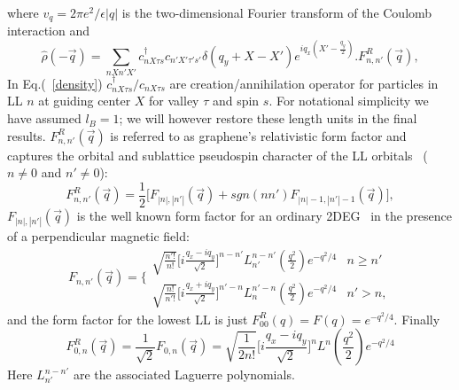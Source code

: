 \documentclass{ws-ijmpb}
\begin{document}
where $v_{q} = 2 \pi e^{2}/ \epsilon |q|$ is the two-dimensional Fourier transform of 
the Coulomb interaction and
\begin{equation}
\hat{\rho}(-\vec{q}) = \sum_{n X n' X'} c^{\dagger}_{n X \tau s} c_{n' X'
\tau' s'} \delta (q_{y} + X - X') e^{i q_{x}(X'-\frac{q_{y}}{2})}.
F^{R}_{n,n'}(\vec{q}),
\label{density}
\end{equation}
In Eq.(~\ref{density}) 
$c^{\dagger}_{n X \tau s} /c_{n X \tau s}$ are creation/annihilation 
operator for particles in LL $n$ at guiding center $X$ for valley $\tau $ and spin
$s$. For notational simplicity we have assumed $l_{B} =1$; we will 
however restore these length units in the final results. $F^{R}_{n,n'}(\vec{q})$ 
is referred to as 
graphene's relativistic form factor and captures the orbital and 
sublattice pseudospin character of the LL 
orbitals~\cite{kentaroQHF} 
($n \neq 0 $ and $n' \neq 0$): 
\begin{equation}
F^{R}_{n,n'}(\vec{q}) = \frac{1}{2} \big[ F_{|n|,|n'|}(\vec{q}) + sgn(nn')
F_{|n|-1,|n'|-1}(\vec{q}) \big],
\end{equation}
$ F_{|n|,|n'|}(\vec{q})$ is the well known form factor for an ordinary 
2DEG~\cite{allanearlypapers} in the presence of a perpendicular magnetic field:
\begin{equation}
F_{n,n'}(\vec{q}) = \bigg\{ \begin{array}{cc}
\sqrt{\frac{n'!}{n!}} \big[i\frac{q_{x} -i q_{y}}{\sqrt{2}} \big]^{n-n'}
L_{n'}^{n-n'}(\frac{q^{2}}{2}) e^{-q^{2}/4} & n \geq  n'\\
\sqrt{\frac{n!}{n'!}} \big[i\frac{q_{x} + i q_{y}}{\sqrt{2}} \big]^{n'-n}
L_{n}^{n'-n}(\frac{q^{2}}{2}) e^{-q^{2}/4} & n' > n,
\end{array}
\end{equation}
and the form factor for the lowest LL is just $F_{00}^{R}(q) = F(q)= e^{-q^{2}/4}$.  Finally 
\begin{equation}
F^{R}_{0,n}(\vec{q}) = \frac{1}{\sqrt{2}}F_{0,n}(\vec{q}) = \sqrt{\frac{1}{2n!}}
\big[i\frac{q_{x} -i
q_{y}}{\sqrt{2}} \big]^{n} L^{n}(\frac{q^{2}}{2}) e^{-q^{2}/4}
\end{equation}
Here $ L_{n'}^{n-n'} $ are the associated Laguerre polynomials. 
\end{document}
